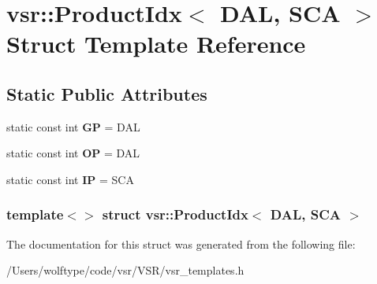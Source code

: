 \hypertarget{structvsr_1_1_product_idx_3_01_d_a_l_00_01_s_c_a_01_4}{\section{vsr\-:\-:Product\-Idx$<$ D\-A\-L, S\-C\-A $>$ Struct Template Reference}
\label{structvsr_1_1_product_idx_3_01_d_a_l_00_01_s_c_a_01_4}
}
\subsection*{Static Public Attributes}
\begin{DoxyCompactItemize}
\item 
\hypertarget{structvsr_1_1_product_idx_3_01_d_a_l_00_01_s_c_a_01_4_a1af1ba59f8a2b9fe86efec6639c652f8}{static const int {\bfseries G\-P} = D\-A\-L}\label{structvsr_1_1_product_idx_3_01_d_a_l_00_01_s_c_a_01_4_a1af1ba59f8a2b9fe86efec6639c652f8}

\item 
\hypertarget{structvsr_1_1_product_idx_3_01_d_a_l_00_01_s_c_a_01_4_ab81322b1bb4d80b27e5a3efdfc948b3e}{static const int {\bfseries O\-P} = D\-A\-L}\label{structvsr_1_1_product_idx_3_01_d_a_l_00_01_s_c_a_01_4_ab81322b1bb4d80b27e5a3efdfc948b3e}

\item 
\hypertarget{structvsr_1_1_product_idx_3_01_d_a_l_00_01_s_c_a_01_4_ad44f97be1eefd45cdf3b35ca3af6e8ef}{static const int {\bfseries I\-P} = S\-C\-A}\label{structvsr_1_1_product_idx_3_01_d_a_l_00_01_s_c_a_01_4_ad44f97be1eefd45cdf3b35ca3af6e8ef}

\end{DoxyCompactItemize}
\subsubsection*{template$<$$>$ struct vsr\-::\-Product\-Idx$<$ D\-A\-L, S\-C\-A $>$}



The documentation for this struct was generated from the following file\-:\begin{DoxyCompactItemize}
\item 
/\-Users/wolftype/code/vsr/\-V\-S\-R/vsr\-\_\-templates.\-h\end{DoxyCompactItemize}

